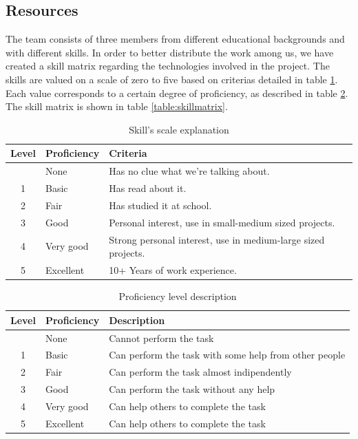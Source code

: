 
\subsection{Resources}
The team consists of three members from different educational backgrounds and with different skills.
In order to better distribute the work among us, we have created a skill matrix regarding the technologies involved in the project.
The skills are valued on a scale of zero to five based on criterias detailed in table \ref{table:skillscale}.
Each value corresponds to a certain degree of proficiency, as described in table \ref{table:proficiency}.
The skill matrix is shown in table \ref{table:skillmatrix}.

\begin{table}[h]
\begin{center}
\begin{tabular}{ | c | l | l | }
  \hline
  Level & Proficiency & Criteria \\
  \hline\noalign{\smallskip}\noalign{\smallskip}\hline
  0 & None		& Has no clue what we're talking about. \\
  1 & Basic		& Has read about it.\\
  2 & Fair		& Has studied it at school.\\
  3 & Good		& Personal interest, use in small-medium sized projects.\\
  4 & Very good	& Strong personal interest, use in medium-large sized projects. \\
  5 & Excellent	& 10+ Years of work experience. \\
  \hline
\end{tabular}
\end{center}
\caption{Skill's scale explanation}
\label{table:skillscale}
\end{table}

\begin{table}[h]
\begin{center}
\begin{tabular}{ | c | l | l | }
  \hline
  Level & Proficiency & Description \\
  \hline\noalign{\smallskip}\noalign{\smallskip}\hline
  0 & None		  & Cannot perform the task \\
  1 & Basic     & Can perform the task with some help from other people \\
  2 & Fair		  & Can perform the task almost indipendently \\
  3 & Good		  & Can perform the task without any help \\
  4 & Very good	& Can help others to complete the task \\
  5 & Excellent	& Can help others to complete the task \\
  \hline
\end{tabular}
\end{center}
\caption{Proficiency level description}
\label{table:proficiency}
\end{table}

